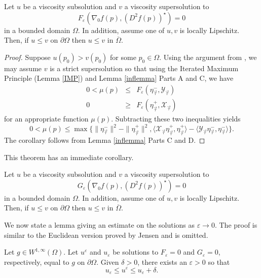 \documentclass[reqno]{amsart}
\newcommand{\ip}[2]{\ensuremath{\langle #1 , #2 \rangle}}
\begin{document}
\begin{theorem}\label{fthm}
Let $u$ be a viscosity subsolution and $v$ a
viscosity supersolution to
\[F_\varepsilon(\nabla_0f(p),(D^2f(p))^\star)=0\] in a bounded domain $\Omega$. In addition, assume one of $u, v$ is locally Lipschitz.  Then, if $u\leq v$ on $\partial \Omega$ then $u\leq v$ in $\overline{\Omega}$. 
\end{theorem}
\begin{proof}
Suppose $u(p_0)>v(p_0)$ for some $p_0\in\Omega$.  Using the argument from \cite{B:HG}, we may assume $v$ is a strict supersolution so that using the Iterated Maximum Principle (Lemma \ref{IMP}) and Lemma \ref{inflemma} Parts A and C, we have 
\begin{eqnarray*}
0<\mu(p) & \leq & F_\varepsilon(\eta^-_{\vec{\tau}},\mathcal{Y}_{\vec{\tau}})\\
0 & \geq & F_\varepsilon(\eta^+_{\vec{\tau}},\mathcal{X}_{\vec{\tau}})
\end{eqnarray*}
for an appropriate function $\mu(p)$. Subtracting these two inequalities yields 
\[0<\mu(p) \leq \max\{\|\eta^-_{\vec{\tau}}\|^2-\|\eta^+_{\vec{\tau}}\|^2,
\ip{\mathcal{X}_{\vec{\tau}}\eta^+_{\vec{\tau}}}{\eta^+_{\vec{\tau}}}
-\ip{\mathcal{Y}_{\vec{\tau}}\eta^-_{\vec{\tau}}}{\eta^-_{\vec{\tau}}}\}.\]
The corollary follows from Lemma \ref{inflemma} Parts C and D. 
\end{proof}
This theorem has an immediate corollary.  
\begin{corollary}\label{gcor}
Let $u$ be a viscosity subsolution and $v$ a
viscosity supersolution to
\[G_\varepsilon(\nabla_0f(p),(D^2f(p))^\star)=0\] in a bounded domain $\Omega$. In addition, assume one of $u, v$ is locally Lipschitz.  Then, if $u\leq v$ on $\partial \Omega$ then $u\leq v$ in $\overline{\Omega}$. 
\end{corollary}

We now state a lemma  giving an estimate on the solutions as
$\varepsilon \rightarrow 0$. 
The proof is similar to the Euclidean version proved by Jensen \cite{Je:ULE} and is omitted.  
\begin{lemma}\label{lemmaunique}
Let $g \in W^{1,\infty}(\Omega)$.
Let $ u^{\varepsilon}$ and $u_{\varepsilon}$ be solutions to 
$ F_{\varepsilon}=0$ and $G_{\varepsilon}=0$,
 respectively, equal to $g$ on $\partial \Omega$.   Given $\delta >0$, there exists an $\varepsilon > 0$ so that
\[u_{\varepsilon} \leq u^{\varepsilon} \leq u_{\varepsilon} + \delta.\]
\end{lemma} 
\end{document}
